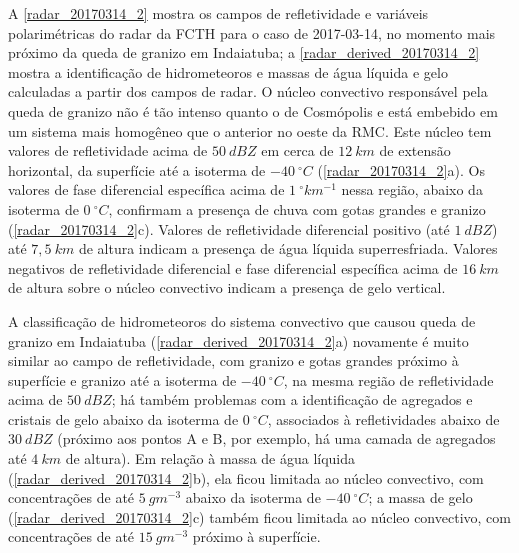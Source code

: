 A \autoref{radar_20170314_2} mostra os campos de refletividade e variáveis polarimétricas do radar da FCTH para o caso de 2017-03-14, no momento mais próximo da queda de granizo em Indaiatuba; a \autoref{radar_derived_20170314_2} mostra a identificação de hidrometeoros e massas de água líquida e gelo calculadas a partir dos campos de radar. O núcleo convectivo responsável pela queda de granizo não é tão intenso quanto o de Cosmópolis e está embebido em um sistema mais homogêneo que o anterior no oeste da RMC. Este núcleo tem valores de refletividade acima de $50\:dBZ$ em cerca de $12\:km$ de extensão horizontal, da superfície até a isoterma de $-40\:^{\circ}C$ (\autoref{radar_20170314_2}a). Os valores de fase diferencial específica acima de $1\:^{\circ}km^{-1}$ nessa região, abaixo da isoterma de $0\:^{\circ}C$, confirmam a presença de chuva com gotas grandes e granizo (\autoref{radar_20170314_2}c). Valores de refletividade diferencial positivo (até $1\:dBZ$) até $7,5\:km$ de altura indicam a presença de água líquida superresfriada. Valores negativos de refletividade diferencial e fase diferencial específica acima de $16\:km$ de altura sobre o núcleo convectivo indicam a presença de gelo vertical.

A classificação de hidrometeoros do sistema convectivo que causou queda de granizo em Indaiatuba (\autoref{radar_derived_20170314_2}a) novamente é muito similar ao campo de refletividade, com granizo e gotas grandes próximo à superfície e granizo até a isoterma de $-40\:^{\circ}C$, na mesma região de refletividade acima de $50\:dBZ$; há também problemas com a identificação de agregados e cristais de gelo abaixo da isoterma de $0\:^{\circ}C$, associados à refletividades abaixo de $30\:dBZ$ (próximo aos pontos A e B, por exemplo, há uma camada de agregados até $4\:km$ de altura). Em relação à massa de água líquida (\autoref{radar_derived_20170314_2}b), ela ficou limitada ao núcleo convectivo, com concentrações de até $5\:gm^{-3}$ abaixo da isoterma de $-40\:^{\circ}C$; a massa de gelo (\autoref{radar_derived_20170314_2}c) também ficou limitada ao núcleo convectivo, com concentrações de até $15\:gm^{-3}$ próximo à superfície.

